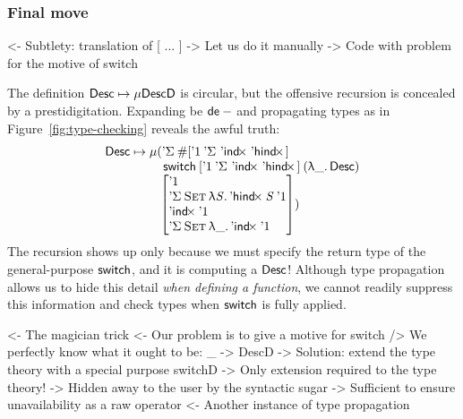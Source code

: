 \subsubsection{Final move}

\begin{wstructure}
<- Subtlety: translation of [ ... ]
    -> Let us do it manually
        -> Code with problem for the motive of switch
\end{wstructure}

The definition \(\Desc \mapsto \Mu{\DescD}\) is circular,
but the offensive recursion is concealed by a prestidigitation.
Expanding be \(\toDesc{-}\) and propagating types as in
Figure~\ref{fig:type-checking} reveals the
awful truth:
\[
\Desc\mapsto
\Mu{\stk{(\DSigma{\EnumT{\sqr{ \DUnit\: \DSigma{\!}{\!}\: \DIndx{\!}\: 
    \DHindx{\!}{\!}}}\\}
    {\;\F{switch}\:\sqr{ \DUnit\: \DSigma{\!}{\!}\: \DIndx{\!}\: 
    \DHindx{\!}{\!}}\:(\LAM{\_}\Desc)\\
\;\sqr{\stkm{
\DUnit                                            \\
                                   \DSigma{\Set}{\LAM{\V{S}} \DHindx{\V{S}}{\DUnit}}   \\
                                   \DIndx{\DUnit}                                    \\
                                   \DSigma{\Set}{\LAM{\_} \DIndx{\DUnit}}
}}})}}
\]
The recursion shows up only because we must specify the return type
of the general-purpose \(\F{switch}\), and it is computing a \(\Desc\)!
Although type propagation
allows us to hide this detail \emph{when defining a function}, we cannot
readily suppress this information and check types
when \(\F{switch}\) is fully applied.

\begin{wstructure}
<- The magician trick
    <- Our problem is to give a motive for switch
        /> We perfectly know what it ought to be: \_ -> DescD
    -> Solution: extend the type theory with a special purpose switchD
        -> Only extension required to the type theory!
        -> Hidden away to the user by the syntactic sugar
            -> Sufficient to ensure unavailability as a raw operator
            <- Another instance of type propagation
\end{wstructure}

%
%

